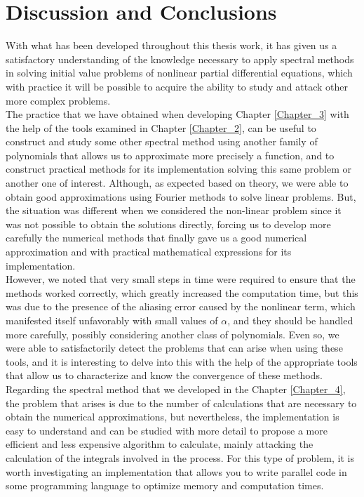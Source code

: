 \chapter{Discussion and Conclusions}

	With what has been developed throughout this thesis work, it has given us a satisfactory understanding of the knowledge necessary to apply spectral methods in solving initial value problems of nonlinear partial differential equations, which with practice it will be possible to acquire the ability to study and attack other more complex problems. \\
	
	The practice that we have obtained when developing Chapter \ref{Chapter_3} with the help of the tools examined in Chapter \ref{Chapter_2}, can be useful to construct and study some other spectral method using another family of polynomials that allows us to approximate more precisely a function, and to construct practical methods for its implementation solving this same problem or another one of interest. Although, as expected based on theory, we were able to obtain good approximations using Fourier methods to solve linear problems. But, the situation was different when we considered the non-linear problem since it was not possible to obtain the solutions directly, forcing us to develop more carefully the numerical methods that finally gave us a good numerical approximation and with practical mathematical expressions for its implementation.  \\
	
	However, we noted that very small steps in time were required to ensure that the methods worked correctly, which greatly increased the computation time, but this was due to the presence of the aliasing error caused by the nonlinear term, which manifested itself unfavorably with small values of $\alpha$, and they should be handled more carefully, possibly considering another class of polynomials. Even so, we were able to satisfactorily detect the problems that can arise when using these tools, and it is interesting to delve into this with the help of the appropriate tools that allow us to characterize and know the convergence of these methods. \\
	
	Regarding the spectral method that we developed in the Chapter \ref{Chapter_4}, the problem that arises is due to the number of calculations that are necessary to obtain the numerical approximations, but nevertheless, the implementation is easy to understand and can be studied with more detail to propose a more efficient and less expensive algorithm to calculate, mainly attacking the calculation of the integrals involved in the process. For this type of problem, it is worth investigating an implementation that allows you to write parallel code in some programming language to optimize memory and computation times. \\
	
